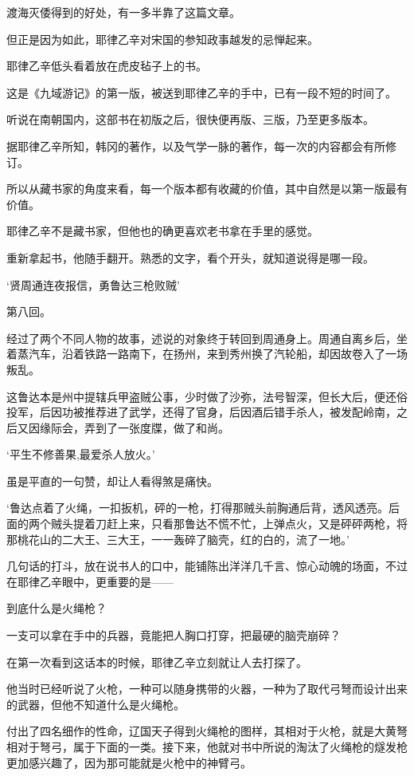 渡海灭倭得到的好处，有一多半靠了这篇文章。

但正是因为如此，耶律乙辛对宋国的参知政事越发的忌惮起来。

耶律乙辛低头看着放在虎皮毡子上的书。

这是《九域游记》的第一版，被送到耶律乙辛的手中，已有一段不短的时间了。

听说在南朝国内，这部书在初版之后，很快便再版、三版，乃至更多版本。

据耶律乙辛所知，韩冈的著作，以及气学一脉的著作，每一次的内容都会有所修订。

所以从藏书家的角度来看，每一个版本都有收藏的价值，其中自然是以第一版最有价值。

耶律乙辛不是藏书家，但他也的确更喜欢老书拿在手里的感觉。

重新拿起书，他随手翻开。熟悉的文字，看个开头，就知道说得是哪一段。

‘贤周通连夜报信，勇鲁达三枪败贼’

第八回。

经过了两个不同人物的故事，述说的对象终于转回到周通身上。周通自离乡后，坐着蒸汽车，沿着铁路一路南下，在扬州，来到秀州换了汽轮船，却因故卷入了一场叛乱。

这鲁达本是州中提辖兵甲盗贼公事，少时做了沙弥，法号智深，但长大后，便还俗投军，后因功被推荐进了武学，还得了官身，后因酒后错手杀人，被发配岭南，之后又因缘际会，弄到了一张度牒，做了和尚。

‘平生不修善果,最爱杀人放火。’

虽是平直的一句赞，却让人看得煞是痛快。

‘鲁达点着了火绳，一扣扳机，砰的一枪，打得那贼头前胸通后背，透风透亮。后面的两个贼头提着刀赶上来，只看那鲁达不慌不忙，上弹点火，又是砰砰两枪，将那桃花山的二大王、三大王，一一轰碎了脑壳，红的白的，流了一地。’

几句话的打斗，放在说书人的口中，能铺陈出洋洋几千言、惊心动魄的场面，不过在耶律乙辛眼中，更重要的是——

到底什么是火绳枪？

一支可以拿在手中的兵器，竟能把人胸口打穿，把最硬的脑壳崩碎？

在第一次看到这话本的时候，耶律乙辛立刻就让人去打探了。

他当时已经听说了火枪，一种可以随身携带的火器，一种为了取代弓弩而设计出来的武器，但他不知道什么是火绳枪。

付出了四名细作的性命，辽国天子得到火绳枪的图样，其相对于火枪，就是大黄弩相对于弩弓，属于下面的一类。接下来，他就对书中所说的淘汰了火绳枪的燧发枪更加感兴趣了，因为那可能就是火枪中的神臂弓。

